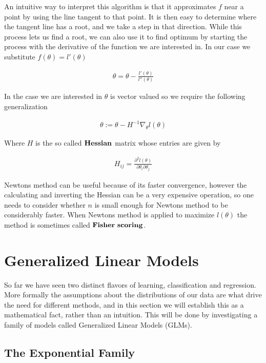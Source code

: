 \documentclass[11pt]{exam}
\begin{document}
An intuitive way to interpret this algorithm is that it approximates $f$ near a point by using the line tangent to that point. It is then easy to determine where the tangent line has a root, and we take a step in that direction. 
While this process lets us find a root, we can also use it to find optimum by starting the process with the derivative of the function we are interested in. In our case we substitute $f(\theta) = l'(\theta)$

\begin{align*}
\theta = \theta - \frac{l'(\theta)}{l''(\theta)}
\end{align*}

In the case we are interested in $\theta$ is vector valued so we require the following generalization

\begin{align*}
\theta := \theta - H^{-1}\nabla_\theta l(\theta)
\end{align*}

Where $H$ is the so called $\bf{Hessian}$ matrix whose entries are given by 

\begin{align*}
H_{ij} = \frac{\partial^2 l(\theta)}{\partial \theta_i \partial \theta_j}
\end{align*}

Newtons method can be useful because of its faster convergence, however the calculating and inverting the Hessian can be a very expensive operation, so one needs to consider whether $n$ is small enough for Newtons method to be considerably faster. When Newtons method is applied to maximize $l(\theta)$ the method is sometimes called $\bf{Fisher \ scoring}$.

\section{Generalized Linear Models}

So far we have seen two distinct flavors of learning, classification and regression. More formally the assumptions about the distributions of our data are what drive the need for different methods, and in this section we will establish this as a mathematical fact, rather than an intuition. This will be done by investigating a family of models called Generalized Linear Models (GLMs).

\subsection{The Exponential Family}
\end{document}
